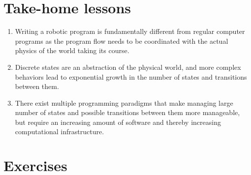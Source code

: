 \section*{Take-home lessons}
\begin{enumerate}
\item Writing a robotic program is fundamentally different from regular computer programs as the program flow needs to be coordinated with the actual physics of the world taking its course.
\item Discrete states are an abstraction of the physical world, and more complex behaviors lead to exponential growth in the number of states and transitions between them.
\item There exist multiple programming paradigms that make managing large number of states and possible transitions between them more manageable, but require an increasing amount of software and thereby increasing computational infrastructure.
\end{enumerate}

\section*{Exercises}\small

